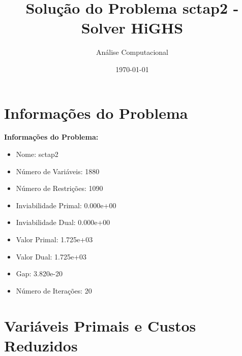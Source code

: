 \documentclass[12pt]{article}
\title{Solução do Problema sctap2 - Solver HiGHS}
\author{Análise Computacional}
\date{\today}
\begin{document}
\maketitle

\section{Informações do Problema}

\textbf{Informações do Problema:}
\begin{itemize}
\item Nome: sctap2
\item Número de Variáveis: 1880
\item Número de Restrições: 1090
\item Inviabilidade Primal: 0.000e+00
\item Inviabilidade Dual: 0.000e+00
\item Valor Primal: 1.725e+03
\item Valor Dual: 1.725e+03
\item Gap: 3.820e-20
\item Número de Iterações: 20
\end{itemize}


\section{Variáveis Primais e Custos Reduzidos}
\end{document}
